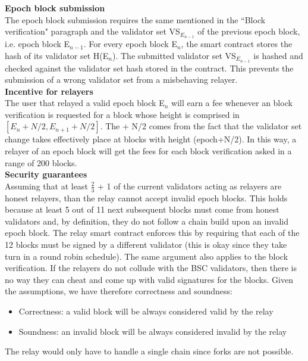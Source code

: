 \noindent
\textbf{Epoch block submission}\\
The epoch block submission requires the same \rlph mentioned in the ``Block verification" paragraph and the validator set VS$_{E_{n-1}}$ of the previous epoch block, i.e. epoch block E$_{n-1}$. For every epoch block E$_{n}$, the smart contract stores the hash of its validator set H(E$_{n}$). The submitted validator set VS$_{E_{n-1}}$ is hashed and checked against the validator set hash stored in the contract. This prevents the submission of a wrong validator set from a misbehaving relayer.\\ %


\noindent
\textbf{Incentive for relayers}\\
The user that relayed a valid epoch block E$_n$ will earn a fee whenever an block verification is requested for a block whose height is comprised in $[E_n + N/2, E_{n+1} + N/2]$. The + N/2 comes from the fact that the validator set change takes effectively place at blocks with height (epoch+N/2). In this way, a relayer of an epoch block will get the fees for each block verification asked in a range of 200 blocks.\\


\noindent
\textbf{Security guarantees}\\
Assuming that at least $\frac{2}{3}$ + 1 of the current validators acting as relayers are honest relayers, than the relay cannot accept invalid epoch blocks. This holds because at least 5 out of 11 next subsequent blocks must come from honest validators and, by definition, they do not follow a chain build upon an invalid epoch block. The relay smart contract enforces this by requiring that each of the 12 blocks must be signed by a different validator (this is okay since they take turn in a round robin schedule). The same argument also applies to the block verification. If the relayers do not collude with the BSC validators, then there is no way they can cheat and come up with valid signatures for the blocks. Given the assumptions, we have therefore correctness and soundness:
\begin{itemize}
    \item Correctness: a valid block will be always considered valid by the relay
    \item Soundness: an invalid block will be always considered invalid by the relay
\end{itemize}
The relay would only have to handle a single chain since forks are not possible.\\  

